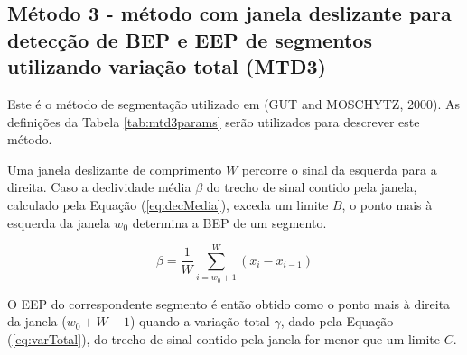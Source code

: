 \subsection{Método 3 - método com janela deslizante para detecção de BEP e EEP de segmentos utilizando variação total (MTD3)}

	Este é o método de segmentação utilizado em (GUT and MOSCHYTZ, 2000). As definições da Tabela \ref{tab:mtd3params} serão utilizados para descrever este método.
	
\begin{table}[htb]
\end{table}

Uma janela deslizante de comprimento $W$ percorre o sinal da esquerda para a direita. Caso a declividade média $\beta$ do trecho de sinal contido pela janela, calculado pela Equação (\ref{eq:decMedia}), exceda um limite $B$, o ponto mais à esquerda da janela $w_0$ determina a BEP de um segmento.

\begin{equation}
\label{eq:decMedia}
	\beta = \frac{1}{W}\sum_{i=w_0+1}^{W}(x_i - x_{i-1})
\end{equation}

O EEP do correspondente segmento é então obtido como o ponto mais à direita da janela ($w_0 + W - 1$) quando a variação total $\gamma$, dado pela Equação (\ref{eq:varTotal}), do trecho de sinal contido pela janela for menor que um limite $C$.

